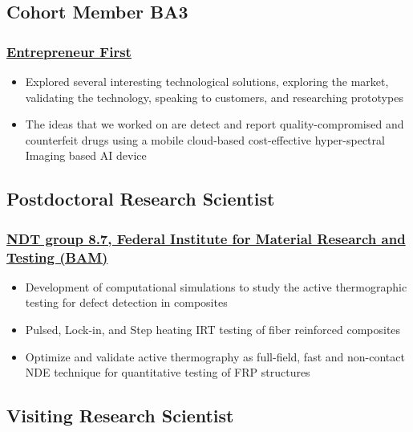 \documentclass{my_cv}%
\begin{document}
\subsection{Cohort Member BA3}
\subsubsection{\href{https://www.joinef.com/}{Entrepreneur First}}
\begin{itemize}[leftmargin=0.15in]
\setlength\itemsep{-0.1em}
\color{mygray}
\item Explored several interesting technological solutions, exploring the market, validating the technology, speaking to customers, and researching prototypes
\item The ideas that we worked on are detect and report quality-compromised and counterfeit drugs using a mobile cloud-based cost-effective hyper-spectral Imaging based AI device
\end{itemize}
{\color{mygray1} \hdashrule[0.1ex]{18.8cm}{0.2mm}{1mm}}
\subsection{Postdoctoral Research Scientist}
\subsubsection{\href{https://www.bam.de/Navigation/DE/Home/home.html}{NDT group 8.7, Federal Institute for Material Research and Testing (BAM)}}
\begin{itemize}[leftmargin=0.15in]
\setlength\itemsep{-0.1em}
\color{mygray}
\item Development of computational simulations to study the active thermographic testing for defect detection in composites
\item Pulsed, Lock-in, and Step heating IRT testing of fiber reinforced composites 
\item Optimize and validate active thermography as full-field, fast and non-contact NDE technique for quantitative testing of FRP structures
\end{itemize}
{\color{mygray1} \hdashrule[0.1ex]{18.8cm}{0.2mm}{1mm}}
\subsection{Visiting Research Scientist}
\end{document}
